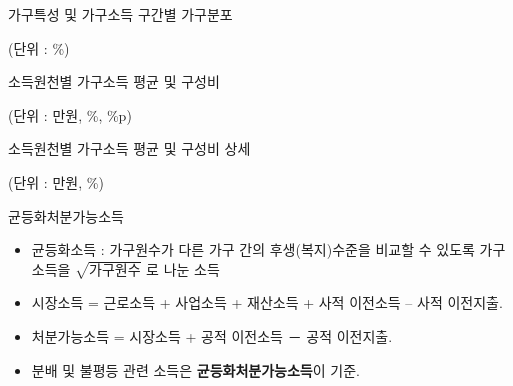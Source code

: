 \documentclass[aspectratio=169,xcolor=dvipsnames,handout]{beamer}
\begin{document}
\begin{frame}{가구특성 및 가구소득 구간별 가구분포}
    \begin{table}
        \raggedleft %
        \tiny{(단위 : \%)} %
        \hspace*{2em} %
        \\
        \centering
        \resizebox{.95\textwidth}{!}{
           
        }
       \caption{가구특성 및 가구소득 구간별 가구분포} 
    \end{table}
\end{frame}

\begin{frame}{소득원천별 가구소득 평균 및 구성비}
    \begin{table}
        \raggedleft %
        \tiny{(단위 : 만원, \%, \%p)} %
        \hspace*{2em} %
        \\
        \centering
        \resizebox{.95\textwidth}{!}{
           
        }
       \caption{소득원천별 가구소득 평균 및 구성비}
    \end{table}
\end{frame}

\begin{frame}{소득원천별 가구소득 평균 및 구성비 상세}
    \begin{table}
        \raggedleft %
        \tiny{(단위 : 만원, \%)} %
        \hspace*{2em} %
        \\
        \centering
        \resizebox{.95\textwidth}{!}{
           
        }
       \caption{소득원천별 가구소득 평균 및 구성비 상세}
    \end{table}
\end{frame}

\begin{frame}{균등화처분가능소득}
    \begin{itemize}
        \item 균등화소득 :  가구원수가 다른 가구 간의 후생(복지)수준을 비교할 수 있도록 가구소득을 $\sqrt{\text{가구원수}}$ 로 나눈 소득
        \item 시장소득 = 근로소득 + 사업소득 + 재산소득 + 사적 이전소득 – 사적 이전지출.
        \item 처분가능소득 = 시장소득 + 공적 이전소득 － 공적 이전지출.
        \item 분배 및 불평등 관련 소득은 \textbf{균등화처분가능소득}이 기준.
    \end{itemize}
\end{frame}
\end{document}
